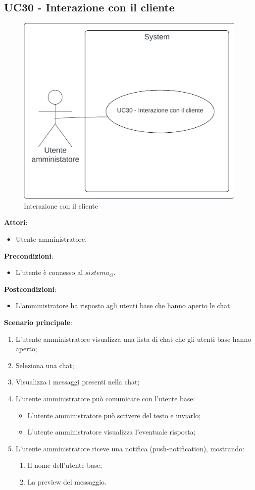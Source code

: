 \subsection{UC30 - Interazione con il cliente}\label{usecase:30}
\begin{figure}[H]
    \centering
    \includegraphics[width=0.75\linewidth]{ucd/UCD30.png}
    \caption{Interazione con il cliente}
\end{figure}
\textbf{Attori}:
\begin{itemize}
    \item Utente amministratore.
\end{itemize}
\textbf{Precondizioni}:
\begin{itemize}
    \item L'utente è connesso al $\textit{sistema}_G$.
\end{itemize}
\textbf{Postcondizioni}:
\begin{itemize}
    \item L'amministratore ha risposto agli utenti base che hanno aperto le chat.
\end{itemize}
\textbf{Scenario principale}:
\begin{enumerate}
    \item L'utente amministratore visualizza una lista di chat che gli utenti base hanno aperto;
    \item Seleziona una chat;
    \item Visualizza i messaggi presenti nella chat;
    \item L'utente amministratore può comunicare con l'utente base:
    \begin{itemize}
        \item L'utente amministratore può scrivere del testo e inviarlo;
        \item L'utente amministratore visualizza l'eventuale risposta;
    \end{itemize}
    \item L'utente amministratore riceve una notifica (push-notification), mostrando:
    \begin{enumerate}
        \item Il nome dell'utente base;
        \item La preview del messaggio.
    \end{enumerate}
\end{enumerate}
